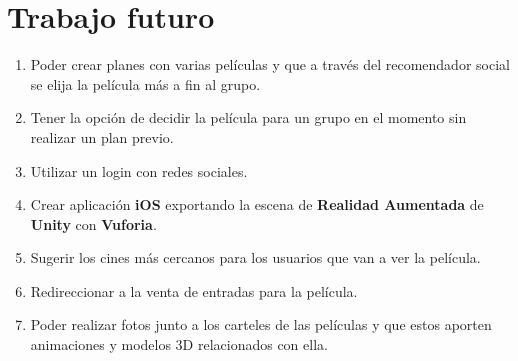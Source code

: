 
\cleardoublepage


\chapter{Trabajo futuro}
\label{makereference6}

\begin{enumerate}  
    \item Poder crear planes con varias películas y que a través del recomendador social se elija la película más a fin al grupo.
    \item Tener la opción de decidir la película para un grupo en el momento sin realizar un plan previo.
    \item Utilizar un login con redes sociales.
    \item Crear aplicación \textbf{iOS} exportando la escena de \textbf{Realidad Aumentada} de \textbf{Unity} con \textbf{Vuforia}.
    \item Sugerir los cines más cercanos para los usuarios que van a ver la película.
    \item Redireccionar a la venta de entradas para la película.
    \item Poder realizar fotos junto a los carteles de las películas y que estos aporten animaciones y modelos 3D relacionados con ella.
\end{enumerate}